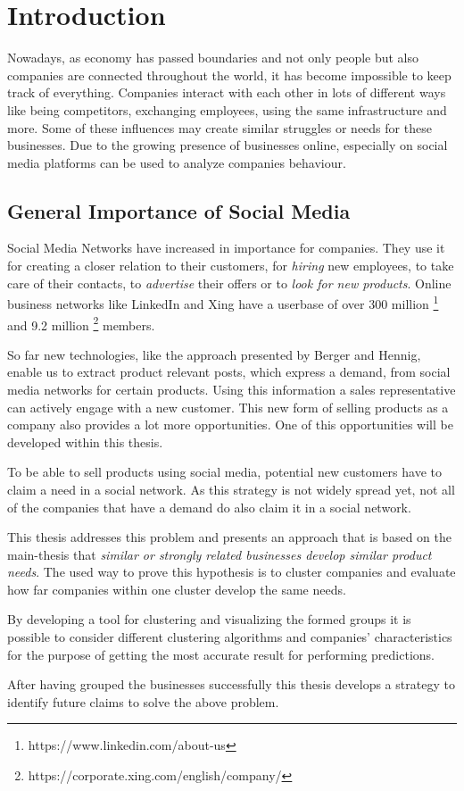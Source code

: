 \section{Introduction}

Nowadays, as economy has passed boundaries and not only people but also companies are connected throughout the world,
it has become impossible to keep track of everything. Companies interact with each other in lots of different ways like
being competitors, exchanging employees, using the same infrastructure and more. Some of these influences may create
similar struggles or needs for these businesses. Due to the growing presence of businesses online, especially on
social media platforms can be used to analyze companies behaviour.

\subsection{General Importance of Social Media}
Social Media Networks have increased in importance for companies. They use it for creating a closer relation to their customers,
for \emph{hiring} new employees, to take care of their contacts, to \emph{advertise} their offers or to \emph{look for new products}. Online business networks like
LinkedIn and Xing have a userbase of over 300 million \footnote{https://www.linkedin.com/about-us} and 9.2 million \footnote{https://corporate.xing.com/english/company/}
members.

So far new technologies, like the approach presented by Berger and Hennig\cite{n2o}, enable us to extract product relevant posts,
which express a demand, from social media networks for certain products. Using this information a sales representative can
actively engage with a new customer. This new form of selling products as a company also provides a lot more opportunities.
One of this opportunities will be developed within this thesis.

To be able to sell products using social media, potential new customers have to claim a need in a social network. As this
strategy is not widely spread yet, not all of the companies that have a demand do also claim it in a social network.

This thesis addresses this problem and presents an approach that is based on the main-thesis
that \emph{similar or strongly related businesses develop similar product needs}. The used way to prove this hypothesis is
to cluster companies and evaluate how far companies within one cluster develop the same needs.

By developing a tool for clustering and visualizing the formed groups it is possible to consider different clustering
algorithms and companies' characteristics for the purpose of getting the most accurate result for performing predictions.

After having grouped the businesses successfully this thesis develops a strategy to identify future claims to solve
the above problem.
